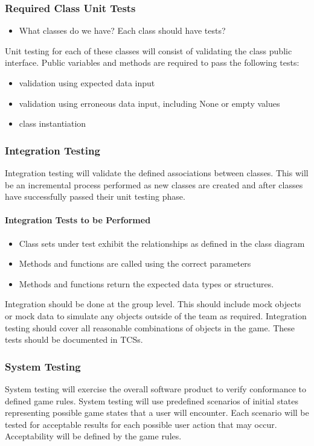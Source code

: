\documentclass[report]{article}
\begin{document}
\subsubsection{Required Class Unit Tests}
\begin{itemize}
\item What classes do we have? Each class should have tests?
\end{itemize}
Unit testing for each of these classes will consist of validating the class public interface. Public variables and methods are required to pass the following tests:
\begin{itemize}
\item validation using expected data input
\item validation using erroneous data input, including None or empty values
\item class instantiation
\end{itemize}

\subsubsection{Integration Testing}
Integration testing will validate the defined associations between classes. This will be an incremental process performed as new classes are created and after classes have successfully passed their unit testing phase. 
\paragraph{Integration Tests to be Performed}
\begin{itemize}
\item Class sets under test exhibit the relationships as defined in the class diagram
\item Methods and functions are called using the correct parameters
\item Methods and functions return the expected data types or structures.
\end{itemize}

Integration should be done at the group level. This should include mock objects or mock data to simulate any objects outside of the team as required. Integration testing should cover all reasonable combinations of objects in the game. These tests should be documented in TCSs.

\subsubsection{System Testing}
System testing will exercise the overall software product to verify conformance to defined game rules. System testing will use predefined scenarios of initial states representing possible game states that a user will encounter. Each scenario will be tested for acceptable results for each possible user action that may occur. Acceptability will be defined by the game rules. 
\end{document}
